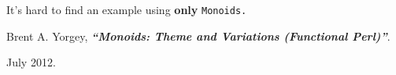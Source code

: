 \documentclass{beamer}
\begin{document}
{
\begin{frame}[plain]
  \begin{block}{}

  It's hard to find an example using \textbf{only} \texttt{Monoids.}
  \vspace{0.8cm}

  Brent A. Yorgey, {\it \bf ``Monoids: Theme and Variations (Functional Perl)''}.

  July 2012.
  \end{block}
\end{frame}
}
\end{document}
